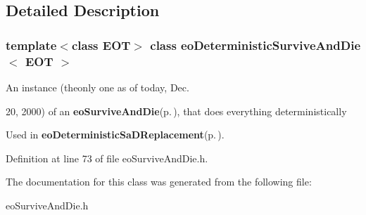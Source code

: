 \subsection{Detailed Description}
\subsubsection*{template$<$class EOT$>$ class eo\-Deterministic\-Survive\-And\-Die$<$ EOT $>$}

An instance (theonly one as of today, Dec. 

20, 2000) of an {\bf eo\-Survive\-And\-Die}{\rm (p.\,\pageref{classeo_survive_and_die})}, that does everything deterministically

Used in {\bf eo\-Deterministic\-Sa\-DReplacement}{\rm (p.\,\pageref{classeo_deterministic_sa_d_replacement})}. 



Definition at line 73 of file eo\-Survive\-And\-Die.h.

The documentation for this class was generated from the following file:\begin{CompactItemize}
\item 
eo\-Survive\-And\-Die.h\end{CompactItemize}
